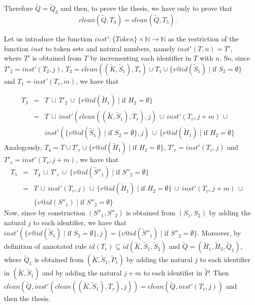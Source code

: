 \documentclass[final]{acmtrans2e}
\newcommand{\rrarrow}{\longrightarrow}
\begin{document}
\begin{description}
Therefore $\tilde Q=\tilde Q_3$ and then, to prove the thesis, we have only to prove that \[clean(\tilde Q,T_3)=clean(\tilde Q, T_5).\]

Let us introduce the function $inst': \{Token\}\times\mathbb{N} \rrarrow \mathbb{N}$ as
the restriction of the function $inst$ to token sets and natural numbers, namely
$inst'(T,n)= T'$, where $T'$ is obtained from $T$ by
incrementing each identifier in $T$ with $n$. So, since
$T'_2= inst'(T_2, j)$,
$T_2= clean((\tilde K, \tilde S_1), T_r)\cup T_1\cup \{v@id(\tilde S_1)\mid \mbox{if } S_2= \emptyset\}$ and
$T_1=inst'(T_v, m)$, we have that

$$
\begin{array}{lcl}
T_3 & = & T\, \cup \, T'_2\, \cup \,\{r@id(\tilde H_1)\mid \mbox{if } H_2= \emptyset\}\\
       &=& T \, \cup \, inst'(clean((\tilde K, \tilde S_1), T_r), j)\, \cup \, inst'(T_v, j+ m)
       \,\cup \\
       && inst'(\{v@id(\tilde S_1) \mid \mbox{if } S_2= \emptyset\}, j)\, \cup \,
       \{r@id(\tilde H_1)\mid \mbox{if } H_2= \emptyset\}
\end{array}
$$
Analogously, $T_4= T \cup T'_r \cup \{r@id(\tilde H_1)\mid \mbox{if } H_2= \emptyset\}$,
$T'_r = inst'(T_r, j)$ and $T'_v= inst'(T_v,j+m)$, we have that
$$
\begin{array}{lcl}
T_5 &=& T_4\, \cup \, T'_v \, \cup \, \{v@id(\tilde S''_1)\mid \mbox{if } S''_2= \emptyset\}\\

    &=& T \, \cup \, inst'(T_r, j) \, \cup \, \{r@id(\tilde H_1)\mid \mbox{if } H_2= \emptyset\}\,
    \cup \, inst'(T_v,j+m) \, \cup \, \\
    &&\{v@id(S''_1)\mid \mbox{if } S''_2= \emptyset\}
    \end{array}
$$
Now, since by construction $(S''_1, S''_2)$ is obtained from $(S_1,  S_2)$ by adding the natural $j$ to each identifier, we have that $inst'(\{v@id(\tilde S_1) \mid \mbox{if } S_2= \emptyset\}, j)= \{v@id(\tilde S''_1)\mid \mbox{if } S''_2= \emptyset\}$.
Moreover, by definition of annotated rule $id(T_r) \subseteq id (\tilde K, \tilde S_1, \tilde S_2)$
and $\tilde Q=(\tilde H_1,\tilde H_3,\tilde Q_1)$, where
$\tilde Q_1$ is obtained from $(\tilde K,\tilde S_1,\tilde P_1)$ by adding the natural $j$ to each identifier in
$(\tilde K,\tilde S_1)$ and by adding the natural $j+m$ to each identifier in
$\tilde P$. Then $clean(\tilde Q, inst'(clean((\tilde K, \tilde S_1), T_r), j))=
clean(\tilde Q, inst'(T_r, j))$ and then the thesis.
\end{description}
\noindent{$\Box$}
\end{document}
